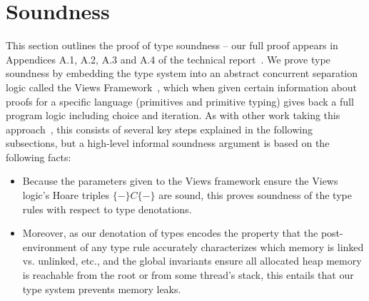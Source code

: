 \section{Soundness}
\label{sec:soundness}
This section outlines the proof of type soundness -- our full proof appears in Appendices A.1, A.2, A.3 and A.4 of the technical report~\cite{isotek}.
We prove type soundness by embedding the type system into an abstract concurrent separation logic called the Views Framework~\cite{views}, which when given certain information about proofs for a specific language (primitives and primitive typing) gives back a full program logic including choice and iteration. As with other work taking this approach~\cite{oopsla12,toplas17}, this consists of several key steps explained in the following subsections, but a high-level informal soundness argument is based on the following facts:
\begin{itemize}
\item Because the parameters given to the Views framework ensure the Views logic's Hoare triples $\{-\}C\{-\}$ are sound, this proves soundness of the type rules with respect to type denotations.

\item Moreover, as our denotation of types encodes the property that the post-environment of any type rule accurately characterizes which memory is linked vs. unlinked, etc., and the global invariants ensure all allocated heap memory is reachable from the root or from some thread's stack, this entails that our type system prevents memory leaks.
  \end{itemize}
